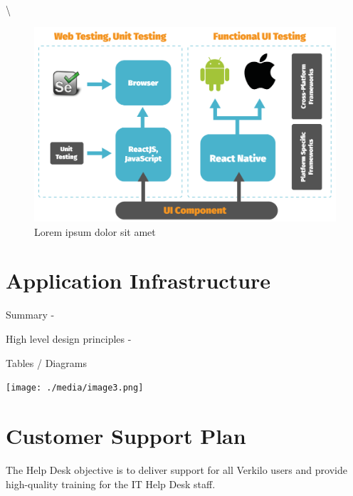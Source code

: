 \documentclass[10pt,openany]{book}
\begin{document}
\textbackslash{}

\begin{figure}
\centering
\includegraphics{./media/react-crossplatform.png}
\caption{Lorem ipsum dolor sit amet}
\end{figure}

\hypertarget{application-infrastructure}{%
\section{Application Infrastructure}\label{application-infrastructure}}

Summary -

High level design principles -

Tables / Diagrams

\texttt{[image: ./media/image3.png]}

\hypertarget{customer-support-plan}{%
\section{Customer Support Plan}\label{customer-support-plan}}

The Help Desk objective is to deliver support for all Verkilo users and
provide high-quality training for the IT Help Desk staff.
\end{document}
